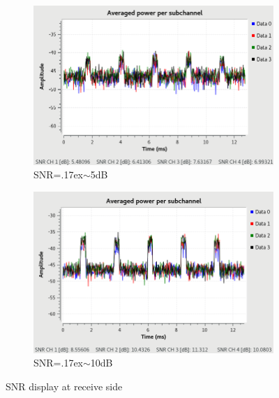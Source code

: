 \begin{figure}[!htb]
    \centering
    \begin{subfigure}[htb]{0.45\textwidth}
        \centering
        \includegraphics[width=\linewidth]{figures/snr_receiv_5}
        \caption{SNR={\raise.17ex\hbox{$\scriptstyle\sim$}}5dB}
    \end{subfigure}
    \begin{subfigure}[htb]{0.45\textwidth}
        \centering
        \includegraphics[width=\linewidth]{figures/snr_receiv_10}
        \caption{SNR={\raise.17ex\hbox{$\scriptstyle\sim$}}10dB}
    \end{subfigure}
    \caption{SNR display at receive side}
    \label{fig:snr_receiv}
\end{figure}

